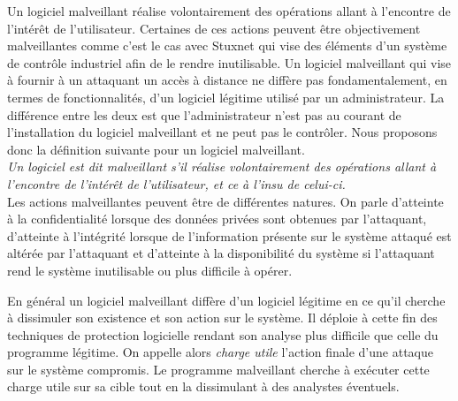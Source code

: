 Un logiciel malveillant réalise volontairement des opérations allant à l'encontre de l'intérêt de l'utilisateur. 
Certaines de ces actions peuvent être objectivement malveillantes comme c'est le cas avec Stuxnet qui vise des éléments d'un système de contrôle industriel afin de le rendre inutilisable. 
Un logiciel malveillant qui vise à fournir à un attaquant un accès à distance ne diffère pas fondamentalement, en termes de fonctionnalités, d'un logiciel légitime utilisé par un administrateur.
La différence entre les deux est que l'administrateur n'est pas au courant de l'installation du logiciel malveillant et ne peut pas le contrôler.
Nous proposons donc la définition suivante pour un logiciel malveillant.
\\

\textit{Un logiciel est dit malveillant s'il réalise volontairement des opérations allant à l'encontre de l'intérêt de l'utilisateur, et ce à l'insu de celui-ci.}
\\ 

Les actions malveillantes peuvent être de différentes natures. On parle d'atteinte à la confidentialité lorsque des données privées sont obtenues par l'attaquant, d'atteinte à l'intégrité lorsque de l'information présente sur le système attaqué est altérée par l'attaquant et d'atteinte à la disponibilité du système si l'attaquant rend le système inutilisable ou plus difficile à opérer.


En général un logiciel malveillant diffère d'un logiciel légitime en ce qu'il cherche à dissimuler son existence et son action sur le système. Il déploie à cette fin des techniques de protection logicielle rendant son analyse plus difficile que celle du programme légitime.
On appelle alors \emph{charge utile} l'action finale d'une attaque sur le système compromis.
Le programme malveillant cherche à exécuter cette charge utile sur sa cible tout en la dissimulant à des analystes éventuels.

